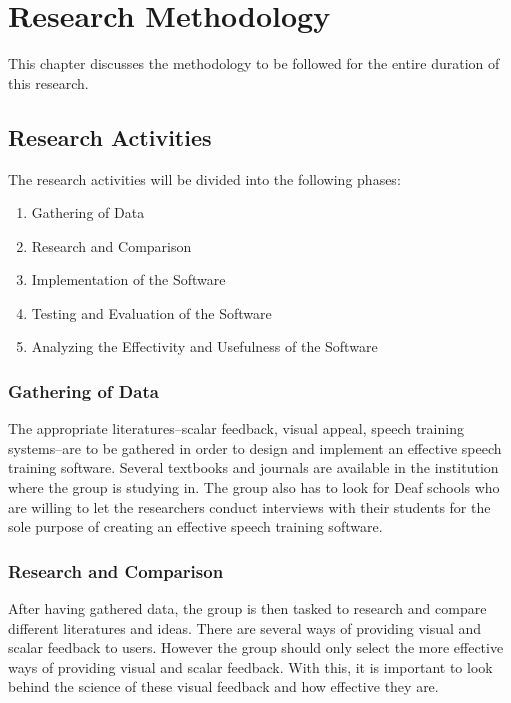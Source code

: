 %
%
%                 

\chapter{Research Methodology}
This chapter discusses the methodology to be followed for the entire duration of this research.

\section{Research Activities}
The research activities will be divided into the following phases:
\begin{enumerate}
\item Gathering of Data
\item Research and Comparison
\item Implementation of the Software
\item Testing and Evaluation of the Software
\item Analyzing the Effectivity and Usefulness of the Software
\end{enumerate}

\subsection{Gathering of Data}
The appropriate literatures--scalar feedback, visual appeal, speech training systems--are to be gathered in order to design and implement an effective speech training software. Several textbooks and journals are available in the institution where the group is studying in. The group also has to look for Deaf schools who are willing to let the researchers conduct interviews with their students for the sole purpose of creating an effective speech training software.

\subsection{Research and Comparison}
After having gathered data, the group is then tasked to research and compare different literatures and ideas. There are several ways of providing visual and scalar feedback to users. However the group should only select the more effective ways of providing visual and scalar feedback. With this, it is important to look behind the science of these visual feedback and how effective they are.

